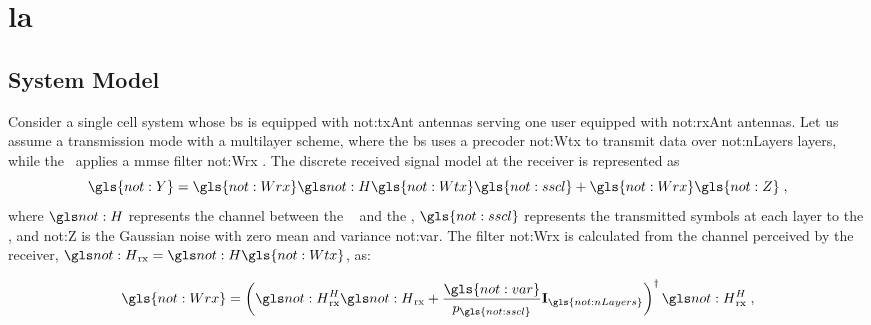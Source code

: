 \chapter{\Acl{la}} \label{chp:la}




\section{System Model}
\label{sec:la-system-model}

Consider a single cell system whose \gls{bs} is equipped with \gls{not:txAnt} antennas serving one user equipped with \gls{not:rxAnt} antennas.
%
Let us assume a transmission mode with a multilayer scheme, where the \gls{bs} uses a precoder \gls{not:Wtx}  to transmit data over  \gls{not:nLayers} layers, while the \ue~applies a \gls{mmse} filter \gls{not:Wrx} .
%
The discrete received signal model at the receiver is represented as
\begin{equation}
\label{eq.:rx_signal}
\gls{not:Y} =
\gls{not:Wrx}
\channel
\gls{not:Wtx}
\gls{not:sscl}
+
\gls{not:Wrx}
\gls{not:Z} \;,
\end{equation}
\noindent where $\channel $  represents the channel between the \base~ and the \ue, $\gls{not:sscl}$ represents the transmitted symbols at each layer to the \ue, and \gls{not:Z} is the Gaussian noise with zero mean and variance \gls{not:var}.
%
The filter \gls{not:Wrx} is calculated from the channel perceived by the receiver, $\channel_{\textrm{rx}} = \channel \gls{not:Wtx}$, as:

\begin{equation}
\label{eq.:Wrx}
\gls{not:Wrx} =
\left(
\channel_{\textrm{rx}}^H
\channel_{\textrm{rx}}
+
\frac{ \gls{not:var} }{ p_{\gls{not:sscl}} }
\mathbf{I}_{\gls{not:nLayers}} \right)^\dagger
\channel_{\textrm{rx}}^H \;,
\end{equation}

